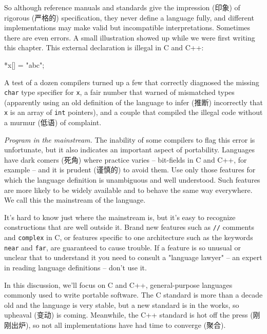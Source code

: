 So although reference manuals and standards give the impression (印象) of
rigorous (严格的) specification, they never define a language fully, and
different implementations may make valid but incompatible interpretations.
Sometimes there are even errors. A small illustration showed up while we
were first writing this chapter. This external declaration is illegal in C
and C++:
\begin{badcode}
    *x[] = {"abc"};
\end{badcode}
A test of a dozen compilers turned up a few that correctly diagnosed the
missing \verb'char' type specifier for \verb'x', a fair number that warned
of mismatched types (apparently using an old definition of the language to
infer (推断) incorrectly that \verb'x' is an array of \verb'int' pointers),
and a couple that compiled the illegal code without a murmur (低语) of
complaint.

\emph{Program in the mainstream.} The inability of some compilers to flag
this error is unfortunate, but it also indicates an important aspect of
portability.  Languages have dark comers (死角) where practice varies --
bit-fields in C and C++, for example -- and it is prudent (谨慎的) to avoid
them. Use only those features for which the language definition is
unambiguous and well understood. Such features are more likely to be widely
available and to behave the same way everywhere. We call this the
mainstream of the language.

It's hard to know just where the mainstream is, but it's easy to recognize
constructions that are well outside it. Brand new features such as
\verb'//' comments and \verb'complex' in C, or features specific to one
architecture such as the keywords \verb'near' and \verb'far', are
guaranteed to cause trouble. If a feature is so unusual or unclear that to
understand it you need to consult a "language lawyer" -- an expert in
reading language definitions -- don't use it.

In this discussion, we'll focus on C and C++, general-purpose languages
commonly used to write portable software. The C standard is more than a
decade old and the language is very stable, but a new standard is in the
works, so upheaval (变动) is coming.  Meanwhile, the C++ standard is hot
off the press (刚刚出炉), so not all implementations have had time to
converge (聚合).

